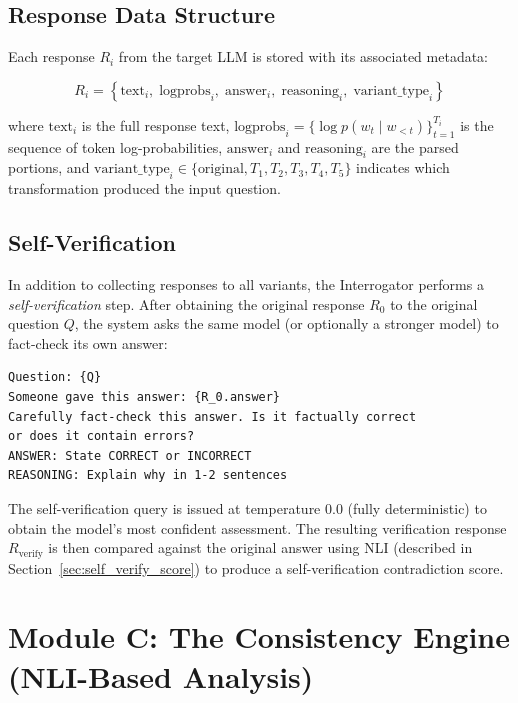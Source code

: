 \subsection{Response Data Structure}

Each response $R_i$ from the target LLM is stored with its associated metadata:

\begin{equation}
    R_i = \left\{ \text{text}_i, \; \text{logprobs}_i, \; \text{answer}_i, \; \text{reasoning}_i, \; \text{variant\_type}_i \right\}
\end{equation}

\noindent
where $\text{text}_i$ is the full response text, $\text{logprobs}_i = \{\log p(w_t \mid w_{<t})\}_{t=1}^{T_i}$ is the sequence of token log-probabilities, $\text{answer}_i$ and $\text{reasoning}_i$ are the parsed portions, and $\text{variant\_type}_i \in \{\text{original}, T_1, T_2, T_3, T_4, T_5\}$ indicates which transformation produced the input question.

\subsection{Self-Verification}
\label{sec:self_verify}

In addition to collecting responses to all variants, the Interrogator performs a \emph{self-verification} step. After obtaining the original response $R_0$ to the original question $Q$, the system asks the same model (or optionally a stronger model) to fact-check its own answer:

\begin{verbatim}
Question: {Q}
Someone gave this answer: {R_0.answer}
Carefully fact-check this answer. Is it factually correct
or does it contain errors?
ANSWER: State CORRECT or INCORRECT
REASONING: Explain why in 1-2 sentences
\end{verbatim}

\noindent
The self-verification query is issued at temperature 0.0 (fully deterministic) to obtain the model's most confident assessment. The resulting verification response $R_{\text{verify}}$ is then compared against the original answer using NLI (described in Section~\ref{sec:self_verify_score}) to produce a self-verification contradiction score.


\section{Module C: The Consistency Engine (NLI-Based Analysis)}


